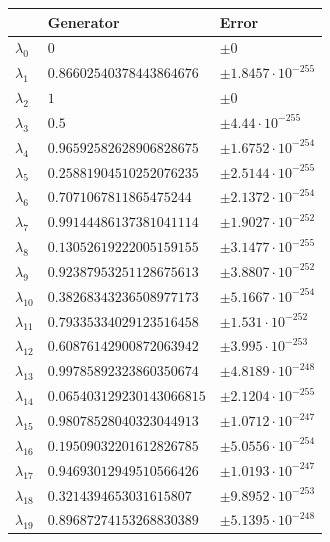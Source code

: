 \documentclass[a4paper,10pt]{article}
\begin{document}
\begin{appendix}
\begin{table}
  \centering
  \begin{tabular}{|l|ll|}
  \hline
  {}             & Generator                 & Error \\
  \hline
  $\lambda_{0}$  & $0$                       &  $\pm 0$ \\
  $\lambda_{1}$  & $0.86602540378443864676$  &  $\pm 1.8457 \cdot 10^{-255}$ \\
  $\lambda_{2}$  & $1$                       &  $\pm 0$ \\
  $\lambda_{3}$  & $0.5$                     &  $\pm 4.44 \cdot 10^{-255}$ \\
  $\lambda_{4}$  & $0.96592582628906828675$  &  $\pm 1.6752 \cdot 10^{-254}$ \\
  $\lambda_{5}$  & $0.25881904510252076235$  &  $\pm 2.5144 \cdot 10^{-255}$ \\
  $\lambda_{6}$  & $0.7071067811865475244$   &  $\pm 2.1372 \cdot 10^{-254}$ \\
  $\lambda_{7}$  & $0.99144486137381041114$  &  $\pm 1.9027 \cdot 10^{-252}$ \\
  $\lambda_{8}$  & $0.13052619222005159155$  &  $\pm 3.1477 \cdot 10^{-255}$ \\
  $\lambda_{9}$  & $0.92387953251128675613$  &  $\pm 3.8807 \cdot 10^{-252}$ \\
  $\lambda_{10}$ & $0.38268343236508977173$  &  $\pm 5.1667 \cdot 10^{-254}$ \\
  $\lambda_{11}$ & $0.79335334029123516458$  &  $\pm 1.531 \cdot 10^{-252}$ \\
  $\lambda_{12}$ & $0.60876142900872063942$  &  $\pm 3.995 \cdot 10^{-253}$ \\
  $\lambda_{13}$ & $0.99785892323860350674$  &  $\pm 4.8189 \cdot 10^{-248}$ \\
  $\lambda_{14}$ & $0.065403129230143066815$ &  $\pm 2.1204 \cdot 10^{-255}$ \\
  $\lambda_{15}$ & $0.98078528040323044913$  &  $\pm 1.0712 \cdot 10^{-247}$ \\
  $\lambda_{16}$ & $0.19509032201612826785$  &  $\pm 5.0556 \cdot 10^{-254}$ \\
  $\lambda_{17}$ & $0.94693012949510566426$  &  $\pm 1.0193 \cdot 10^{-247}$ \\
  $\lambda_{18}$ & $0.3214394653031615807$   &  $\pm 9.8952 \cdot 10^{-253}$ \\
  $\lambda_{19}$ & $0.89687274153268830389$  &  $\pm 5.1395 \cdot 10^{-248}$ \\

\end{tabular}
\end{table}
\end{appendix}
\end{document}
